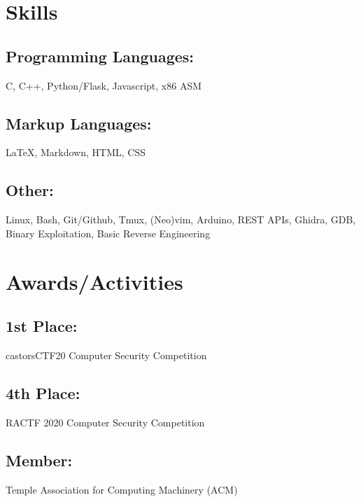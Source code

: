 \documentclass{article}
\begin{document}
\section{Skills}
\subsection{Programming Languages:}
C, C++, Python/Flask, Javascript, x86 ASM
\subsection{Markup Languages:}
{\LaTeX}, Markdown, HTML, CSS
\subsection{Other:}
Linux, Bash, Git/Github, Tmux, (Neo)vim, Arduino, REST APIs, Ghidra, GDB, Binary Exploitation, Basic Reverse Engineering

\section{Awards/Activities}
\subsection{1st Place: } castorsCTF20 Computer Security Competition
\subsection{4th Place: } RACTF 2020 Computer Security Competition
\subsection{Member: } Temple Association for Computing Machinery (ACM)
\end{document}
